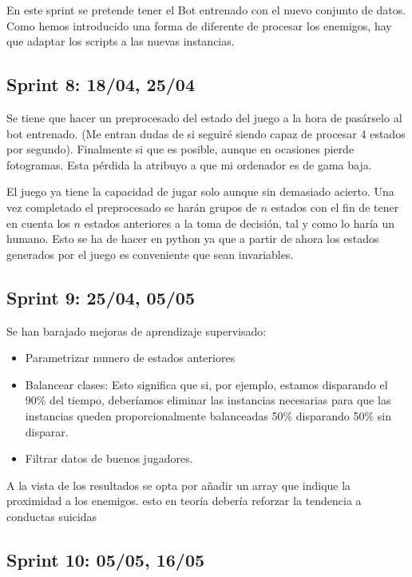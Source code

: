 En este sprint se pretende tener el Bot entrenado con el nuevo conjunto de datos. Como hemos introducido una forma de diferente de procesar los enemigos, hay que adaptar los scripts a las nuevas instancias.


\subsection{Sprint 8:  18/04, 25/04}

Se tiene que hacer un preprocesado del estado del juego a la hora de pasárselo al bot entrenado. (Me entran dudas de si seguiré siendo capaz de procesar 4 estados por segundo). Finalmente si que es posible, aunque en ocasiones pierde fotogramas. Esta pérdida la atribuyo a que mi ordenador es de gama baja.

El juego ya tiene la capacidad de jugar solo aunque sin demasiado acierto. Una vez completado el preprocesado se harán grupos de $n$ estados con el fin de tener en cuenta los $n$ estados anteriores a la toma de decisión, tal y como lo haría un humano. Esto se ha de hacer en python ya que a partir de ahora los estados generados por el juego es conveniente que sean invariables.

\subsection{Sprint 9:  25/04, 05/05}

Se han barajado mejoras de aprendizaje supervisado: 
\begin{itemize}
    \item Parametrizar numero de estados anteriores
    \item Balancear clases: Esto significa que si, por ejemplo, estamos disparando el 90\% del tiempo, deberíamos eliminar las instancias necesarias para que las instancias queden proporcionalmente balanceadas 50\% disparando 50\% sin disparar. 
    \item Filtrar datos de buenos jugadores.
\end{itemize}
  
  A la vista de los resultados se opta por añadir un array que indique la proximidad a los enemigos. esto en teoría debería reforzar la tendencia a conductas suicidas
  

\subsection{Sprint 10:  05/05, 16/05}

